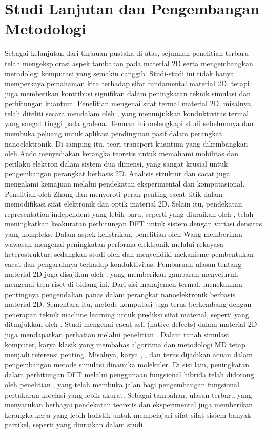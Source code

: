 \section{Studi Lanjutan dan Pengembangan Metodologi}
Sebagai kelanjutan dari tinjauan pustaka di atas, sejumlah penelitian terbaru telah mengeksplorasi aspek tambahan pada material 2D serta mengembangkan metodologi komputasi yang semakin canggih. Studi-studi ini tidak hanya memperkaya pemahaman kita terhadap sifat fundamental material 2D, tetapi juga memberikan kontribusi signifikan dalam peningkatan teknik simulasi dan perhitungan kuantum. Penelitian mengenai sifat termal material 2D, misalnya, telah diteliti secara mendalam oleh \citep{Khan2017}, yang menunjukkan konduktivitas termal yang sangat tinggi pada grafena. Temuan ini melengkapi studi sebelumnya dan membuka peluang untuk aplikasi pendinginan pasif dalam perangkat nanoelektronik. Di samping itu, teori transport kuantum yang dikembangkan oleh Ando \citep{ando_dynamical_2002} menyediakan kerangka teoretis untuk memahami mobilitas dan perilaku elektron dalam sistem dua dimensi, yang sangat krusial untuk pengembangan perangkat berbasis 2D. Analisis struktur dan cacat juga mengalami kemajuan melalui pendekatan eksperimental dan komputasional. Penelitian oleh Zhang \citep{Zhang2020} dan \citep{Slotman2013} menyoroti peran penting cacat titik dalam memodifikasi sifat elektronik dan optik material 2D. Selain itu, pendekatan representation-independent yang lebih baru, seperti yang diuraikan oleh \citep{Shen2022}, telah meningkatkan keakuratan perhitungan DFT untuk sistem dengan variasi densitas yang kompleks. Dalam aspek kelistrikan, penelitian oleh Wang \citep{Wang2017} memberikan wawasan mengenai peningkatan performa elektronik melalui rekayasa heterostruktur, sedangkan studi oleh \citep{Munro2020} dan \citep{Huang2012} menyelidiki mekanisme pembentukan cacat dan pengaruhnya terhadap konduktivitas. Pembaruan ulasan tentang material 2D juga disajikan oleh \citep{Bhimanapati2016}, yang memberikan gambaran menyeluruh mengenai tren riset di bidang ini. Dari sisi manajemen termal, \citep{Khan2017} menekankan pentingnya pengendalian panas dalam perangkat nanoelektronik berbasis material 2D. Sementara itu, metode komputasi juga terus berkembang dengan penerapan teknik machine learning untuk prediksi sifat material, seperti yang ditunjukkan oleh \citep{Zheng2025}. Studi mengenai cacat asli (native defects) dalam material 2D juga mendapatkan perhatian melalui penelitian \citep{Weston2018}. Dalam ranah simulasi komputer, karya klasik yang membahas algoritma dan metodologi MD tetap menjadi referensi penting. Misalnya, karya \citep{Allen1989}, \citep{Rapaport2004}, dan \citep{Allen1989} terus dijadikan acuan dalam pengembangan metode simulasi dinamika molekuler. Di sisi lain, peningkatan dalam perhitungan DFT melalui penggunaan fungsional hibrida telah didorong oleh penelitian \citep{Becke1993}, yang telah membuka jalan bagi pengembangan fungsional pertukaran-korelasi yang lebih akurat. Sebagai tambahan, ulasan terbaru yang menyatukan berbagai pendekatan teoretis dan eksperimental juga memberikan kerangka kerja yang lebih holistik untuk mempelajari sifat-sifat sistem banyak partikel, seperti yang diuraikan dalam studi 